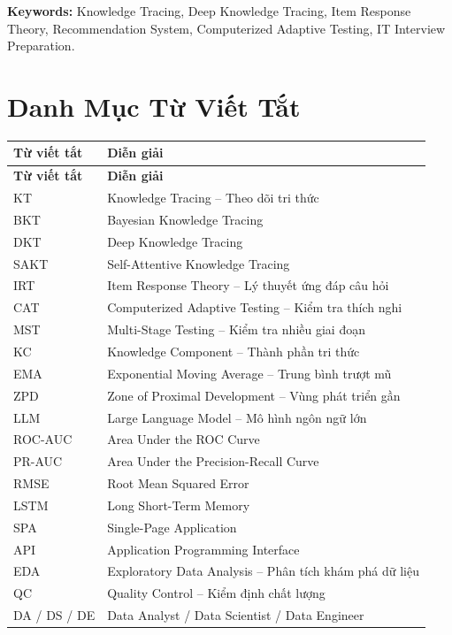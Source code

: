 \documentclass[12pt, a4paper]{report}
\begin{document}
\noindent\textbf{Keywords:} Knowledge Tracing, Deep Knowledge Tracing, Item Response Theory, Recommendation System, Computerized Adaptive Testing, IT Interview Preparation.


\tableofcontents
\listoffigures
\listoftables

\chapter*{Danh Mục Từ Viết Tắt}

\begin{longtable}{ll}
\toprule
\textbf{Từ viết tắt} & \textbf{Diễn giải} \\
\midrule
\endfirsthead
\toprule
\textbf{Từ viết tắt} & \textbf{Diễn giải} \\
\midrule
\endhead
\bottomrule
\endfoot
KT     & Knowledge Tracing -- Theo dõi tri thức \\
BKT    & Bayesian Knowledge Tracing \\
DKT    & Deep Knowledge Tracing \\
SAKT   & Self-Attentive Knowledge Tracing \\
IRT    & Item Response Theory -- Lý thuyết ứng đáp câu hỏi \\
CAT    & Computerized Adaptive Testing -- Kiểm tra thích nghi \\
MST    & Multi-Stage Testing -- Kiểm tra nhiều giai đoạn \\
KC     & Knowledge Component -- Thành phần tri thức \\
EMA    & Exponential Moving Average -- Trung bình trượt mũ \\
ZPD    & Zone of Proximal Development -- Vùng phát triển gần \\
LLM    & Large Language Model -- Mô hình ngôn ngữ lớn \\
ROC-AUC & Area Under the ROC Curve \\
PR-AUC & Area Under the Precision-Recall Curve \\
RMSE   & Root Mean Squared Error \\
LSTM   & Long Short-Term Memory \\
SPA    & Single-Page Application \\
API    & Application Programming Interface \\
EDA    & Exploratory Data Analysis -- Phân tích khám phá dữ liệu \\
QC     & Quality Control -- Kiểm định chất lượng \\
DA / DS / DE & Data Analyst / Data Scientist / Data Engineer \\
\end{longtable}
\end{document}
